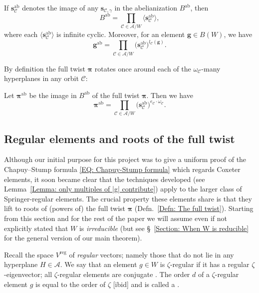 \documentclass[ALCO, Unicode]{cedram}
\newcommand{\op}[1]{\operatorname{#1}}
\newcommand{\op}[1]{\operatorname{#1}}
\begin{document}
\begin{theo}\label{Thm: The abelianization of B(W)}
If $\bm s_{\mathcal{C}}^{\op{ab}}$ denotes the image of any $\bm s_{\mathcal{C},\gamma}$ in the abelianization $B^{\op{ab}}$, then $$B^{\op{ab}}=\prod_{\mathcal{C}\in \mathcal{A}/W}\langle \bm s_{\mathcal{C}}^{\op{ab}}\rangle,$$ where each $\langle \bm s_{\mathcal{C}}^{\op{ab}}\rangle$ is infinite cyclic. Moreover, for an element $\bm g\in B(W)$, we have $$ \bm g^{\op{ab}}=\prod_{\mathcal{C}\in\mathcal{A}/W}(\bm s_{\mathcal{C}}^{\op{ab}}\big)^{l_{\mathcal{C}}(\bm g)}.$$ 
\end{theo}

\noindent By definition the full twist $\bm \pi$ rotates once around each of the $\omega_{\mathcal{C}}$-many hyperplanes in any orbit $\mathcal{C}$: 

\begin{coro}\label{Cor: the abelianization of the full twist}
Let $\bm \pi^{\op{ab}}$ be the image in $B^{\op{ab}}$ of the full twist $\bm \pi$. Then we have $$\bm\pi^{\op{ab}}=\prod_{\mathcal{C}\in\mathcal{A}/W}\big(\bm s_{\mathcal{C}}^{\op{ab}}\big)^{e_{\mathcal{C}}\cdot \omega_{\mathcal{C}}}.$$
\end{coro}



\subsection{Regular elements and roots of the full twist}
\label{Section:Regular elements and roots of the full twist}

Although our initial purpose for this project was to give a uniform proof of the Chapuy--Stump formula \eqref{EQ: Chapuy-Stump formula} which regards Coxeter elements, it soon became clear that the techniques developed (see Lemma~\ref{Lemma: only multiples of |g| contribute}) apply to the larger class of Springer-regular elements. The crucial property these elements share is that they lift to roots of (powers of) the full twist $\bm \pi$ (Defn.~\ref{Defn: The full twist}). Starting from this section and for the rest of the paper we will assume even if not explicitly stated that $W$ is \emph{irreducible} (but see \S~\ref{Section: When W is reducible} for the general version of our main theorem).

\begin{defi}\label{Defn: regular element}
Recall the space $V^{\op{reg}}$ of \emph{regular} vectors; namely those that do not lie in any hyperplane $H\in\mathcal{A}$. We say that an element $g\in W$ is {\color{blue} $\zeta$-regular} if it has a regular $\zeta$-eigenvector; all $\zeta$-regular elements are conjugate \cite[Corol.~11.25]{lehrer-taylor-book}. The order $d$ of a $\zeta$-regular element $g$ is equal to the order of $\zeta$ \textup{[ibid]} and is called a \emph{\color{blue}{regular number}}.
\end{defi}
\end{document}
